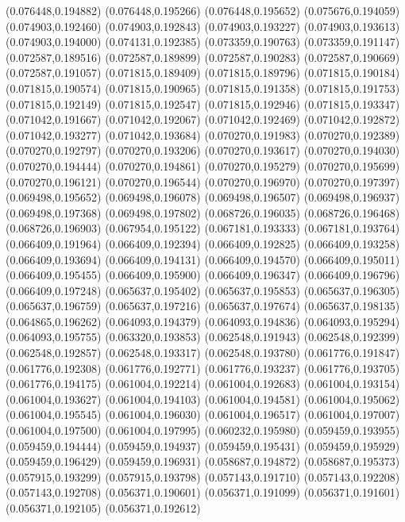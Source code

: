 (0.076448,0.194882)
(0.076448,0.195266)
(0.076448,0.195652)
(0.075676,0.194059)
(0.074903,0.192460)
(0.074903,0.192843)
(0.074903,0.193227)
(0.074903,0.193613)
(0.074903,0.194000)
(0.074131,0.192385)
(0.073359,0.190763)
(0.073359,0.191147)
(0.072587,0.189516)
(0.072587,0.189899)
(0.072587,0.190283)
(0.072587,0.190669)
(0.072587,0.191057)
(0.071815,0.189409)
(0.071815,0.189796)
(0.071815,0.190184)
(0.071815,0.190574)
(0.071815,0.190965)
(0.071815,0.191358)
(0.071815,0.191753)
(0.071815,0.192149)
(0.071815,0.192547)
(0.071815,0.192946)
(0.071815,0.193347)
(0.071042,0.191667)
(0.071042,0.192067)
(0.071042,0.192469)
(0.071042,0.192872)
(0.071042,0.193277)
(0.071042,0.193684)
(0.070270,0.191983)
(0.070270,0.192389)
(0.070270,0.192797)
(0.070270,0.193206)
(0.070270,0.193617)
(0.070270,0.194030)
(0.070270,0.194444)
(0.070270,0.194861)
(0.070270,0.195279)
(0.070270,0.195699)
(0.070270,0.196121)
(0.070270,0.196544)
(0.070270,0.196970)
(0.070270,0.197397)
(0.069498,0.195652)
(0.069498,0.196078)
(0.069498,0.196507)
(0.069498,0.196937)
(0.069498,0.197368)
(0.069498,0.197802)
(0.068726,0.196035)
(0.068726,0.196468)
(0.068726,0.196903)
(0.067954,0.195122)
(0.067181,0.193333)
(0.067181,0.193764)
(0.066409,0.191964)
(0.066409,0.192394)
(0.066409,0.192825)
(0.066409,0.193258)
(0.066409,0.193694)
(0.066409,0.194131)
(0.066409,0.194570)
(0.066409,0.195011)
(0.066409,0.195455)
(0.066409,0.195900)
(0.066409,0.196347)
(0.066409,0.196796)
(0.066409,0.197248)
(0.065637,0.195402)
(0.065637,0.195853)
(0.065637,0.196305)
(0.065637,0.196759)
(0.065637,0.197216)
(0.065637,0.197674)
(0.065637,0.198135)
(0.064865,0.196262)
(0.064093,0.194379)
(0.064093,0.194836)
(0.064093,0.195294)
(0.064093,0.195755)
(0.063320,0.193853)
(0.062548,0.191943)
(0.062548,0.192399)
(0.062548,0.192857)
(0.062548,0.193317)
(0.062548,0.193780)
(0.061776,0.191847)
(0.061776,0.192308)
(0.061776,0.192771)
(0.061776,0.193237)
(0.061776,0.193705)
(0.061776,0.194175)
(0.061004,0.192214)
(0.061004,0.192683)
(0.061004,0.193154)
(0.061004,0.193627)
(0.061004,0.194103)
(0.061004,0.194581)
(0.061004,0.195062)
(0.061004,0.195545)
(0.061004,0.196030)
(0.061004,0.196517)
(0.061004,0.197007)
(0.061004,0.197500)
(0.061004,0.197995)
(0.060232,0.195980)
(0.059459,0.193955)
(0.059459,0.194444)
(0.059459,0.194937)
(0.059459,0.195431)
(0.059459,0.195929)
(0.059459,0.196429)
(0.059459,0.196931)
(0.058687,0.194872)
(0.058687,0.195373)
(0.057915,0.193299)
(0.057915,0.193798)
(0.057143,0.191710)
(0.057143,0.192208)
(0.057143,0.192708)
(0.056371,0.190601)
(0.056371,0.191099)
(0.056371,0.191601)
(0.056371,0.192105)
(0.056371,0.192612)
